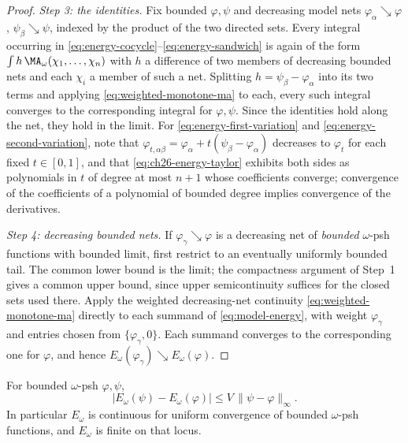 \begin{proof}
\emph{Step 3: the identities.}  Fix bounded $\varphi,\psi$ and decreasing
model nets $\varphi_\alpha\searrow\varphi$,
$\psi_\beta\searrow\psi$, indexed by the product of the two directed sets.
Every integral occurring in
\eqref{eq:energy-cocycle}--\eqref{eq:energy-sandwich} is again of the form
$\int h\,\MA_\omega(\chi_1,\ldots,\chi_n)$ with $h$ a difference of two
members of decreasing bounded nets and each $\chi_i$ a member of such a
net.  Splitting $h=\psi_\beta-\varphi_\alpha$ into its two terms and
applying \eqref{eq:weighted-monotone-ma} to each, every such integral
converges to the corresponding integral for $\varphi,\psi$.  Since the
identities hold along the net, they hold in the limit.  For
\eqref{eq:energy-first-variation} and
\eqref{eq:energy-second-variation}, note that
$\varphi_{t,\alpha\beta}=\varphi_\alpha+t(\psi_\beta-\varphi_\alpha)$
decreases to $\varphi_t$ for each fixed $t\in[0,1]$, and that
\eqref{eq:ch26-energy-taylor} exhibits both sides as polynomials in $t$ of
degree at most $n+1$ whose coefficients converge; convergence of the
coefficients of a polynomial of bounded degree implies convergence of the
derivatives.

\emph{Step 4: decreasing bounded nets.}  If $\varphi_\gamma\searrow\varphi$
is a decreasing net of \emph{bounded} $\omega$-psh functions with bounded
limit, first restrict to an eventually uniformly bounded tail.  The common
lower bound is the limit; the compactness argument of Step~1 gives a common
upper bound, since upper semicontinuity suffices for the closed sets used
there.  Apply the weighted decreasing-net continuity
\eqref{eq:weighted-monotone-ma} directly to each summand of
\eqref{eq:model-energy}, with weight $\varphi_\gamma$ and entries chosen
from $\{\varphi_\gamma,0\}$.  Each summand converges to the corresponding
one for $\varphi$, and hence
$E_\omega(\varphi_\gamma)\searrow E_\omega(\varphi)$.
\end{proof}

\begin{proposition}
\label{prop:ch26-energy-lipschitz}
For bounded $\omega$-psh $\varphi,\psi$,
\begin{equation}
\label{eq:ch26-energy-lipschitz}
 \bigl|E_\omega(\psi)-E_\omega(\varphi)\bigr|
 \leq V\,\lVert\psi-\varphi\rVert_\infty .
\end{equation}
In particular $E_\omega$ is continuous for uniform convergence of bounded
$\omega$-psh functions, and $E_\omega$ is finite on that locus.
\end{proposition}


